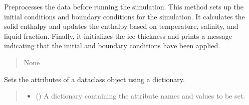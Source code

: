 \documentclass[a4paper,11pt,english,openany]{sphinxmanual}
\begin{document}
\begin{fulllineitems}
\begin{fulllineitems}
\begin{quote}
\begin{description}
\end{description}\end{quote}

\end{fulllineitems}


\begin{fulllineitems}
\label{\detokenize{api/spyice.preprocess.pre_process:src.spyice.preprocess.pre_process.PreProcess.preprocess}}
\pysigstartsignatures
\pysiglinewithargsret
{}
{}
{}
\pysigstopsignatures
\sphinxAtStartPar
Preprocesses the data before running the simulation.
This method sets up the initial conditions and boundary conditions for the simulation.
It calculates the solid enthalpy and updates the enthalpy based on temperature, salinity, and liquid fraction.
Finally, it initializes the ice thickness and prints a message indicating that the initial and boundary conditions have been applied.
\begin{quote}
\begin{description}
\sphinxAtStartPar
None

\end{description}
\end{quote}

\end{fulllineitems}


\begin{fulllineitems}
\label{\detokenize{api/spyice.preprocess.pre_process:src.spyice.preprocess.pre_process.PreProcess.set_dataclass}}
\pysigstartsignatures
\pysiglinewithargsret
{}
{\sphinxparamcomma {}}
{}
\pysigstopsignatures
\sphinxAtStartPar
Sets the attributes of a dataclass object using a dictionary.
\begin{quote}\begin{description}
\begin{itemize}
\item {} 
\sphinxAtStartPar
{} () \textendash{} A dictionary containing the attribute names and values to be set.


\end{itemize}
\end{description}
\end{quote}
\end{fulllineitems}
\end{fulllineitems}
\end{document}
